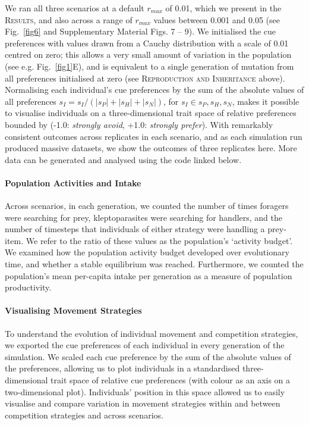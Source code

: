 \begin{refsection}[sorting=nyt]
We ran all three scenarios at a default $r_{max}$ of 0.01, which we present in the \textsc{Results}, and also across a range of $r_{max}$ values between 0.001 and 0.05 (see Fig.~\ref{fig6} and Supplementary Material Figs. 7 -- 9).
We initialised the cue preferences with values drawn from a Cauchy distribution with a scale of 0.01 centred on zero; this allows a very small amount of variation in the population (see e.g. Fig.~\ref{fig1}E), and is equivalent to a single generation of mutation from all preferences initialised at zero (see \textsc{Reproduction and Inheritance} above).
Normalising each individual's cue preferences by the sum of the absolute values of all preferences $s_I = s_I / (|s_P| + |s_H| + |s_N|)$, for $s_I \in s_P, s_H, s_N$, makes it possible to visualise individuals on a three-dimensional trait space of relative preferences bounded by (-1.0: \textit{strongly avoid}, +1.0: \textit{strongly prefer}).
With remarkably consistent outcomes across replicates in each scenario, and as each simulation run produced massive datasets, we show the outcomes of three replicates here.
More data can be generated and analysed using the code linked below.

\paragraph{Population Activities and Intake}

Across scenarios, in each generation, we counted the number of times foragers were searching for prey, kleptoparasites were searching for handlers, and the number of timesteps that individuals of either strategy were handling a prey-item.
We refer to the ratio of these values as the population's `activity budget'.
We examined how the population activity budget developed over evolutionary time, and whether a stable equilibrium was reached.
Furthermore, we counted the population's mean per-capita intake per generation as a measure of population productivity.

\paragraph{Visualising Movement Strategies}

To understand the evolution of individual movement and competition strategies, we exported the cue preferences of each individual in every generation of the simulation.
We scaled each cue preference by the sum of the absolute values of the preferences, allowing us to plot individuals in a standardised three-dimensional trait space of relative cue preferences (with colour as an axis on a two-dimensional plot).
Individuals' position in this space allowed us to easily visualise and compare variation in movement strategies within and between competition strategies and across scenarios.


\end{refsection}
